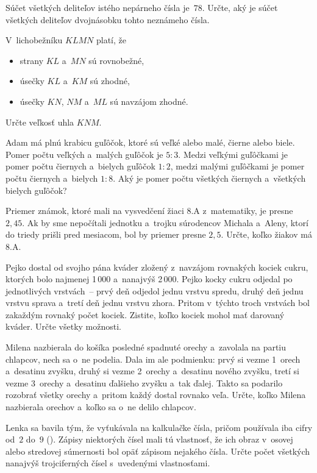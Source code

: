 {%
Súčet všetkých deliteľov istého nepárneho čísla je~$78$.
Určte, aký je súčet všetkých deliteľov dvojnásobku tohto neznámeho čísla.}

{%
V~lichobežníku $KLMN$ platí, že
\begin{itemize}
\item strany $KL$ a~$MN$ sú rovnobežné,
\item úsečky $KL$ a~$KM$ sú zhodné,
\item úsečky $KN$, $NM$ a~$ML$ sú navzájom zhodné.
\end{itemize}
Určte veľkosť uhla $KNM$.}

{%
Adam má plnú krabicu guľôčok, ktoré sú veľké alebo malé, čierne alebo biele.
Pomer počtu veľkých a~malých guľôčok je $5:3$.
Medzi veľkými guľôčkami je pomer počtu čiernych a~bielych guľôčok $1:2$,
medzi malými guľôčkami je pomer počtu čiernych a~bielych $1:8$.
Aký je pomer počtu všetkých čiernych a~všetkých bielych guľôčok?}

{%
Priemer známok, ktoré mali na vysvedčení žiaci 8.A z~matematiky, je presne~$2{,}45$.
Ak by sme nepočítali jednotku a~trojku súrodencov Michala a~Aleny,
ktorí do triedy prišli pred mesiacom, bol by priemer presne $2{,}5$.
Určte, koľko žiakov má 8.A.}

{%
Pejko dostal od svojho pána kváder zložený z~navzájom rovnakých kociek cukru,
ktorých bolo najmenej 1\,000 a~nanajvýš 2\,000.
Pejko kocky cukru odjedal po jednotlivých vrstvách~-- prvý deň odjedol jednu
vrstvu spredu, druhý deň jednu vrstvu sprava a~tretí deň jednu vrstvu zhora.
Pritom v~týchto troch vrstvách bol zakaždým rovnaký počet kociek.
Zistite, koľko kociek mohol mať darovaný kváder.
Určte všetky možnosti.}

{%
Milena nazbierala do košíka posledné spadnuté orechy a~zavolala na partiu chlapcov,
nech sa o~ne podelia.
Dala im ale podmienku:
prvý si vezme 1~orech a~desatinu zvyšku, druhý si vezme 2~orechy a~desatinu
nového zvyšku, tretí si vezme 3~orechy a~desatinu ďalšieho zvyšku
a~tak ďalej.
Takto sa podarilo rozobrať všetky orechy a~pritom každý dostal rovnako veľa.
Určte, koľko Milena nazbierala orechov a~koľko sa o~ne delilo chlapcov.
}

{%
Lenka sa bavila tým, že vyťukávala na kalkulačke čísla, pričom
používala iba cifry od~$2$ do~$9$ (\obr).
Zápisy niektorých čísel mali tú vlastnosť, že ich obraz v~osovej
alebo stredovej súmernosti bol opäť zápisom nejakého čísla.
Určte počet všetkých nanajvýš trojciferných čísel s~uvedenými vlastnosťami.
%
}

